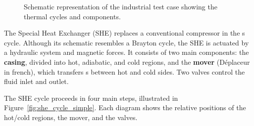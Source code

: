 \begin{figure}[htbp]
    \caption{Schematic representation of the industrial test case showing the thermal cycles and components.}
    \label{fig:SimplifiedIndustrialCycle}
\end{figure}


The Special Heat Exchanger (SHE) replaces a conventional compressor in the
s cycle. Although its schematic resembles a Brayton cycle, the SHE is
actuated by a hydraulic system and magnetic forces. It consists of two main
components: the \textbf{casing}, divided into hot, adiabatic, and cold regions,
and the \textbf{mover} (Déplaceur in french), which transfers s between
hot and cold sides. Two valves control the fluid inlet and outlet.  

The SHE cycle proceeds in four main steps, illustrated in
Figure~\ref{fig:she_cycle_simple}. Each diagram shows the relative positions of
the hot/cold regions, the mover, and the valves.

